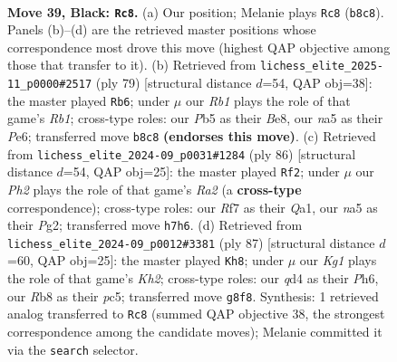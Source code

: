 \documentclass[11pt]{article}
\begin{document}
\clearpage

\begin{figure}[p]\centering
\begin{subfigure}{0.46\textwidth}\centering
\resizebox{\linewidth}{!}{%
\newchessgame
\chessboard[
  setfen={1r4k1/5r1p/8/Np6/3Q2PP/8/PP3P2/3R1K2 b - - 0 39},
  showmover=false,
  pgfstyle=straightmove, color=movearrow, markmove={b8-c8}
]}
\caption{}
\end{subfigure}\hfill
\begin{subfigure}{0.46\textwidth}\centering
\resizebox{\linewidth}{!}{%
\newchessgame
\chessboard[
  setfen={1r2bk2/p5r1/4p3/2Np4/8/7P/P1Q3P1/6K1 b - - 1 40},
  showmover=false,
  pgfstyle=straightmove, color=movearrow, markmove={b8-b6}
]}
\caption{}
\end{subfigure}
\\[4pt]
\begin{subfigure}{0.46\textwidth}\centering
\resizebox{\linewidth}{!}{%
\newchessgame
\chessboard[
  setfen={3r3k/4q2p/8/7p/3p4/1P5P/R5P1/Q6K w - - 0 44},
  showmover=false,
  pgfstyle=straightmove, color=movearrow, markmove={a2-f2}
]}
\caption{}
\end{subfigure}\hfill
\begin{subfigure}{0.46\textwidth}\centering
\resizebox{\linewidth}{!}{%
\newchessgame
\chessboard[
  setfen={8/p5rk/7p/2P2Q2/8/3nr3/P5PP/5RK1 b - - 4 44},
  showmover=false,
  pgfstyle=straightmove, color=movearrow, markmove={h7-h8}
]}
\caption{}
\end{subfigure}
\caption{\textbf{Move 39, Black: \texttt{Rc8}.} (a) Our position; Melanie plays \texttt{Rc8} (\texttt{b8c8}). Panels (b)--(d) are the retrieved master positions whose correspondence most drove this move (highest QAP objective among those that transfer to it). (b) Retrieved from \texttt{lichess\_elite\_2025-11\_p0000\#2517} (ply 79) [structural distance $d$=54, QAP obj=38]: the master played \texttt{Rb6}; under $\mu$ our \emph{Rb1} plays the role of that game's \emph{Rb1}; cross-type roles: our \emph{P}b5 as their \emph{B}e8, our \emph{n}a5 as their \emph{P}e6; transferred move \texttt{b8c8} \textbf{(endorses this move)}. (c) Retrieved from \texttt{lichess\_elite\_2024-09\_p0031\#1284} (ply 86) [structural distance $d$=54, QAP obj=25]: the master played \texttt{Rf2}; under $\mu$ our \emph{Ph2} plays the role of that game's \emph{Ra2} (a \textbf{cross-type} correspondence); cross-type roles: our \emph{R}f7 as their \emph{Q}a1, our \emph{n}a5 as their \emph{P}g2; transferred move \texttt{h7h6}. (d) Retrieved from \texttt{lichess\_elite\_2024-09\_p0012\#3381} (ply 87) [structural distance $d$=60, QAP obj=25]: the master played \texttt{Kh8}; under $\mu$ our \emph{Kg1} plays the role of that game's \emph{Kh2}; cross-type roles: our \emph{q}d4 as their \emph{P}h6, our \emph{R}b8 as their \emph{p}c5; transferred move \texttt{g8f8}. Synthesis: 1 retrieved analog transferred to \texttt{Rc8} (summed QAP objective 38, the strongest correspondence among the candidate moves); Melanie committed it via the \texttt{search} selector.}
\label{fig:thought-m77}
\end{figure}
\end{document}
